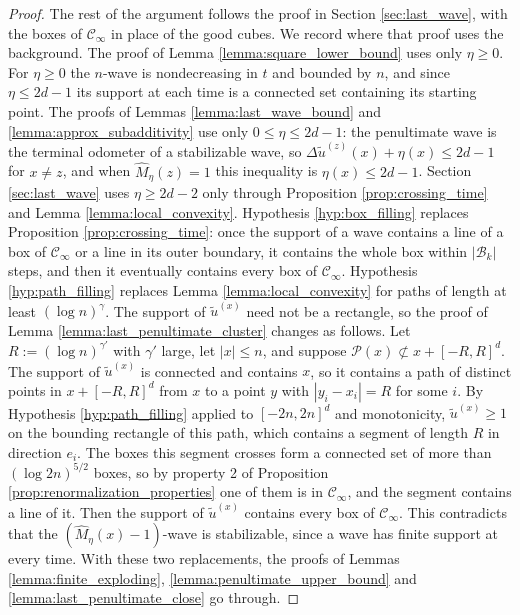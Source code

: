 \documentclass[aap]{imsart}
\begin{document}
\begin{proof}
	The rest of the argument follows the proof in Section \ref{sec:last_wave}, with the boxes of $\mathcal{C}_{\infty}$ in place of the good cubes. We record where that proof uses the background. 
	The proof of Lemma \ref{lemma:square_lower_bound} uses only $\eta \geq 0$. For $\eta \geq 0$ the $n$-wave is nondecreasing in $t$ and bounded by $n$, and since $\eta \leq 2d-1$ its support at each time is a connected set containing its starting point. 
	The proofs of Lemmas \ref{lemma:last_wave_bound} and \ref{lemma:approx_subadditivity} use only $0 \leq \eta \leq 2d - 1$: the penultimate wave is the terminal odometer of a stabilizable wave, so $\Delta \tilde{u}^{(z)}(x) + \eta(x) \leq 2d-1$ for $x \neq z$, and when $\hat{M}_{\eta}(z) = 1$ this inequality is $\eta(x) \leq 2d-1$. 
	Section \ref{sec:last_wave} uses $\eta \geq 2d - 2$ only through Proposition \ref{prop:crossing_time} and Lemma \ref{lemma:local_convexity}. 
	Hypothesis \ref{hyp:box_filling} replaces Proposition \ref{prop:crossing_time}: once the support of a wave contains a line of a box of $\mathcal{C}_{\infty}$ or a line in its outer boundary, it contains the whole box within $|\mathcal{B}_k|$ steps, and then it eventually contains every box of $\mathcal{C}_{\infty}$. 
	Hypothesis \ref{hyp:path_filling} replaces Lemma \ref{lemma:local_convexity} for paths of length at least $(\log n)^{\gamma}$. The support of $\tilde{u}^{(x)}$ need not be a rectangle, so the proof of Lemma \ref{lemma:last_penultimate_cluster} changes as follows. Let $R := (\log n)^{\gamma'}$ with $\gamma'$ large, let $|x| \leq n$, and suppose $\mathcal{P}(x) \not\subset x + [-R,R]^d$. The support of $\tilde{u}^{(x)}$ is connected and contains $x$, so it contains a path of distinct points in $x + [-R,R]^d$ from $x$ to a point $y$ with $|y_i - x_i| = R$ for some $i$. By Hypothesis \ref{hyp:path_filling} applied to $[-2n,2n]^d$ and monotonicity, $\tilde{u}^{(x)} \geq 1$ on the bounding rectangle of this path, which contains a segment of length $R$ in direction $e_i$. The boxes this segment crosses form a connected set of more than $(\log 2n)^{5/2}$ boxes, so by property 2 of Proposition \ref{prop:renormalization_properties} one of them is in $\mathcal{C}_{\infty}$, and the segment contains a line of it. Then the support of $\tilde{u}^{(x)}$ contains every box of $\mathcal{C}_{\infty}$. This contradicts that the $(\hat{M}_{\eta}(x)-1)$-wave is stabilizable, since a wave has finite support at every time. 
	With these two replacements, the proofs of Lemmas \ref{lemma:finite_exploding}, \ref{lemma:penultimate_upper_bound} and \ref{lemma:last_penultimate_close} go through. 


\end{proof}
\end{document}

